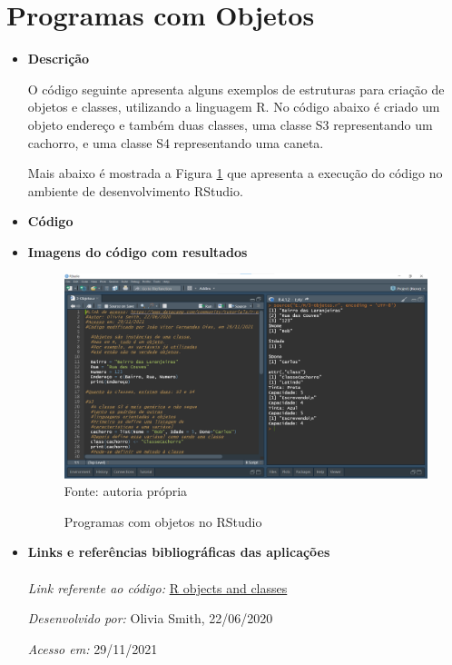   \section{Programas com Objetos}
  \begin{itemize}
  	\item \textbf{Descrição}
  	
  	  O código seguinte apresenta alguns exemplos de estruturas para criação de objetos e classes, utilizando a linguagem R. No código abaixo é criado um objeto endereço e também duas classes, uma classe S3 representando um cachorro, e uma classe S4 representando uma caneta.
  	  
  	  Mais abaixo é mostrada a Figura \ref{Codigo_3} que apresenta a execução do código no ambiente de desenvolvimento RStudio.
  	
  	\item \textbf{Código} 
  	
  	\color{blue}
  	
  	\color{black}
  	
  	\item \textbf{Imagens do código com resultados}
	  	
	  	\begin{figure}[H]  \label{Codigo_3}
	  		\centering
	  		\caption{Programas com objetos no RStudio}
	  		\includegraphics[width=16cm]{PicturesJoaoDias/Codigos/Codigo3.png}
	  		{\tiny \sf Fonte: autoria própria}
	  	\end{figure}
  	
  	\item \textbf{Links e referências bibliográficas das aplicações}
  	  \\ \\
  	  \textit{Link referente ao código:} 
  	  \href{https://www.datacamp.com/community/tutorials/r-objects-and-classes}{R objects and classes}
  	
  	  \textit{Desenvolvido por:} Olivia Smith, 22/06/2020
  	
  	  \textit{Acesso em:} 29/11/2021
  	
  \end{itemize}
	
